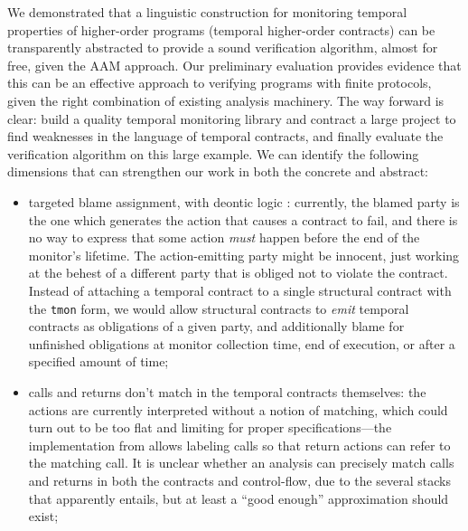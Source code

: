 We demonstrated that a linguistic construction for monitoring temporal properties of higher-order programs (temporal higher-order contracts) can be transparently abstracted to provide a sound verification algorithm, almost for free, given the AAM approach.
%
Our preliminary evaluation provides evidence that this can be an effective approach to verifying programs with finite protocols, given the right combination of existing analysis machinery.
%
The way forward is clear: build a quality temporal monitoring library and contract a large project to find weaknesses in the language of temporal contracts, and finally evaluate the verification algorithm on this large example.
%
We can identify the following dimensions that can strengthen our work in both the concrete and abstract:
\begin{itemize}
\item{targeted blame assignment, with deontic logic \citep{ianjohnson:DBLP:conf/dagstuhl/MeyerWD98}:
%
currently, the blamed party is the one which generates the action that causes a contract to fail, and there is no way to express that some action \emph{must} happen before the end of the monitor's lifetime.
%
The action-emitting party might be innocent, just working at the behest of a different party that is obliged not to violate the contract.
%
Instead of attaching a temporal contract to a single structural contract with the {\tt tmon} form, we would allow structural contracts to \emph{emit} temporal contracts as obligations of a given party, and additionally blame for unfinished obligations at monitor collection time, end of execution, or after a specified amount of time;
}
%
\item{calls and returns don't match in the temporal contracts themselves:
%
the actions are currently interpreted without a notion of matching, which could turn out to be too flat and limiting for proper specifications---the implementation from \dfm{} allows labeling calls so that return actions can refer to the matching call.
%
It is unclear whether an analysis can precisely match calls and returns in both the contracts and control-flow, due to the several stacks that apparently entails, but at least a ``good enough'' approximation should exist;
}
%
\end{itemize}
